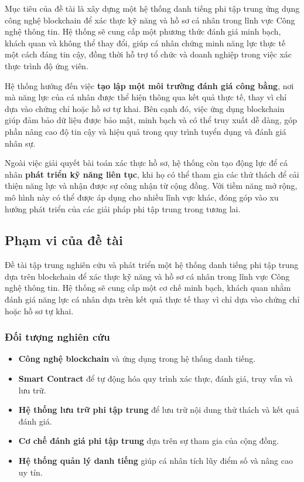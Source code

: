 \documentclass{article}[14pt]
\begin{document}
{    Mục tiêu của đề tài là xây dựng một hệ thống danh tiếng phi tập trung ứng dụng công nghệ blockchain để xác thực kỹ năng và hồ sơ cá nhân trong lĩnh vực Công nghệ thông tin. 
    Hệ thống sẽ cung cấp một phương thức đánh giá minh bạch, khách quan và không thể thay đổi, giúp cá nhân chứng minh năng lực thực tế một cách đáng tin cậy, 
    đồng thời hỗ trợ tổ chức và doanh nghiệp trong việc xác thực trình độ ứng viên.

    Hệ thống hướng đến việc \textbf{tạo lập một môi trường đánh giá công bằng}, nơi mà năng lực của cá nhân được thể hiện thông qua kết quả thực tế, 
    thay vì chỉ dựa vào chứng chỉ hoặc hồ sơ tự khai. Bên cạnh đó, việc ứng dụng blockchain giúp đảm bảo dữ liệu được bảo mật, 
    minh bạch và có thể truy xuất dễ dàng, góp phần nâng cao độ tin cậy và hiệu quả trong quy trình tuyển dụng và đánh giá nhân sự.

    Ngoài việc giải quyết bài toán xác thực hồ sơ, hệ thống còn tạo động lực để cá nhân \textbf{phát triển kỹ năng liên tục}, khi họ có thể tham gia các thử thách 
    để cải thiện năng lực và nhận được sự công nhận từ cộng đồng. Với tiềm năng mở rộng, mô hình này có thể được áp dụng cho nhiều lĩnh vực khác, 
    đóng góp vào xu hướng phát triển của các giải pháp phi tập trung trong tương lai.
    
    \subsection{Phạm vi của đề tài}
    
    Đề tài tập trung nghiên cứu và phát triển một hệ thống danh tiếng phi tập trung dựa trên blockchain để xác thực kỹ năng và hồ sơ cá nhân trong lĩnh vực Công nghệ thông tin. 
    Hệ thống sẽ cung cấp một cơ chế minh bạch, khách quan nhằm đánh giá năng lực cá nhân dựa trên kết quả thực tế thay vì chỉ dựa vào chứng chỉ hoặc hồ sơ tự khai.

    \subsubsection{Đối tượng nghiên cứu}
    \begin{itemize}
        \large
        \item \textbf{Công nghệ blockchain} và ứng dụng trong hệ thống danh tiếng.
        \item \textbf{Smart Contract} để tự động hóa quy trình xác thực, đánh giá, truy vấn và lưu trữ.
        \item \textbf{Hệ thống lưu trữ phi tập trung} để lưu trữ nội dung thử thách và kết quả đánh giá.
        \item \textbf{Cơ chế đánh giá phi tập trung} dựa trên sự tham gia của cộng đồng.
        \item \textbf{Hệ thống quản lý danh tiếng} giúp cá nhân tích lũy điểm số và nâng cao uy tín.
    \end{itemize}

}
\end{document}
